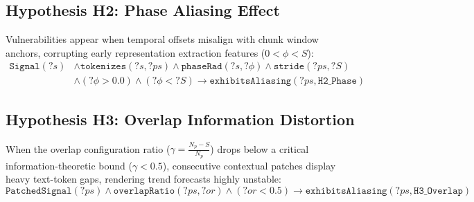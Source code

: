 \subsection{Hypothesis H2: Phase Aliasing Effect}
Vulnerabilities appear when temporal offsets misalign with chunk window anchors, corrupting early representation extraction features ($0 < \phi < S$):
\begin{equation}
	\begin{aligned}
		\texttt{Signal}(?s) &\wedge \texttt{tokenizes}(?s, ?ps) \wedge \texttt{phaseRad}(?s, ?\phi) \wedge \texttt{stride}(?ps, ?S) \\
		&\wedge (?\phi > 0.0) \wedge (?\phi < ?S) \longrightarrow \texttt{exhibitsAliasing}(?ps, \texttt{H2\_Phase})
\end{aligned}
\end{equation}

\subsection{Hypothesis H3: Overlap Information Distortion}
When the overlap configuration ratio ($\gamma = \frac{N_p - S}{N_p}$) drops below a critical information-theoretic bound ($\gamma < 0.5$), consecutive contextual patches display heavy text-token gaps, rendering trend forecasts highly unstable:
\begin{equation}
	\texttt{PatchedSignal}(?ps) \wedge \texttt{overlapRatio}(?ps, ?or) \wedge (?or < 0.5) \longrightarrow \texttt{exhibitsAliasing}(?ps, \texttt{H3\_Overlap})
\end{equation}
